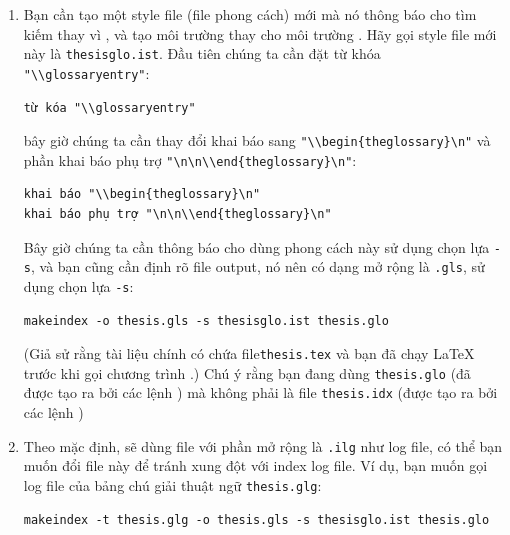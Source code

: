 \documentclass[a4paper]{report}
\begin{document}
\begin{enumerate}
\item Bạn cần tạo một 
style file (file phong cách)  mới mà nó thông báo cho  tìm kiếm  thay vì , và tạo môi trường  thay cho môi trường .
Hãy gọi  style file mới này là \verb|thesisglo.ist|. Đầu tiên chúng ta cần đặt từ khóa \verb|"\\glossaryentry"|:

\begin{verbatim}
từ kóa "\\glossaryentry"
\end{verbatim}
bây giờ chúng ta cần thay đổi khai báo sang \verb|"\\begin{theglossary}\n"| và phần khai báo phụ trợ \latex{\ifscreen\else\linebreak\fi}
\verb|"\n\n\\end{theglossary}\n"|:
\begin{verbatim}
khai báo "\\begin{theglossary}\n"
khai báo phụ trợ "\n\n\\end{theglossary}\n"
\end{verbatim}
Bây giờ chúng ta cần thông báo cho  dùng phong cách này sử dụng chọn lựa \verb|-s|, và bạn cũng cần định rõ file output, nó nên có dạng mở rộng là \verb|.gls|, sử dụng chọn lựa \verb|-s|:

\begin{verbatim}
makeindex -o thesis.gls -s thesisglo.ist thesis.glo
\end{verbatim}
(Giả sử rằng tài liệu chính có chứa file\verb|thesis.tex|  và bạn đã chạy \LaTeX{} trước khi gọi  chương trình .) 
Chú ý rằng bạn đang dùng \verb|thesis.glo| (đã được tạo ra bởi  các lệnh ) mà không phải là file \verb"thesis.idx" (được tạo ra bởi các lệnh )


\item Theo mặc định,   sẽ dùng file với phần mở rộng là \verb|.ilg| như log file, có thể bạn muốn đổi file này để tránh xung đột với index log file. Ví dụ, bạn muốn gọi log file của bảng chú giải thuật ngữ \verb|thesis.glg|:

\begin{verbatim}
makeindex -t thesis.glg -o thesis.gls -s thesisglo.ist thesis.glo
\end{verbatim}

\end{enumerate}
\end{document}
